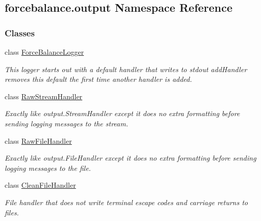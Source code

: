 \hypertarget{namespaceforcebalance_1_1output}{\subsection{forcebalance.\-output Namespace Reference}
\label{namespaceforcebalance_1_1output}
}
\subsubsection*{Classes}
\begin{DoxyCompactItemize}
\item 
class \hyperlink{classforcebalance_1_1output_1_1ForceBalanceLogger}{Force\-Balance\-Logger}
\begin{DoxyCompactList}\small\item\em This logger starts out with a default handler that writes to stdout add\-Handler removes this default the first time another handler is added. \end{DoxyCompactList}\item 
class \hyperlink{classforcebalance_1_1output_1_1RawStreamHandler}{Raw\-Stream\-Handler}
\begin{DoxyCompactList}\small\item\em Exactly like output.\-Stream\-Handler except it does no extra formatting before sending logging messages to the stream. \end{DoxyCompactList}\item 
class \hyperlink{classforcebalance_1_1output_1_1RawFileHandler}{Raw\-File\-Handler}
\begin{DoxyCompactList}\small\item\em Exactly like output.\-File\-Handler except it does no extra formatting before sending logging messages to the file. \end{DoxyCompactList}\item 
class \hyperlink{classforcebalance_1_1output_1_1CleanFileHandler}{Clean\-File\-Handler}
\begin{DoxyCompactList}\small\item\em File handler that does not write terminal escape codes and carriage returns to files. \end{DoxyCompactList}\end{DoxyCompactItemize}
